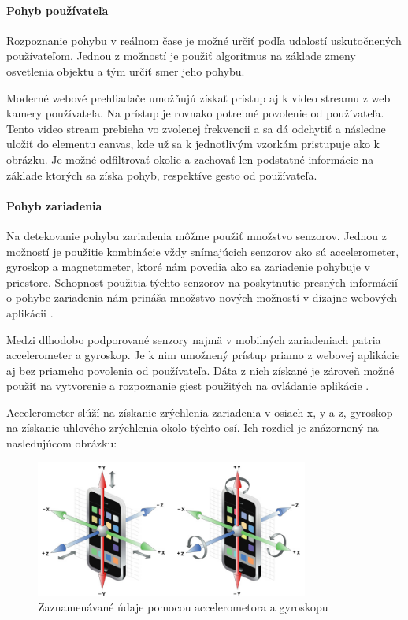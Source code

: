 \newpage
\paragraph{Pohyb používateľa} %

Rozpoznanie pohybu v reálnom čase je možné určiť podľa udalostí uskutočnených používateľom. Jednou z možností je použiť algoritmus na základe zmeny osvetlenia objektu \cite{MotionIllumination} a tým určiť smer jeho pohybu.

Moderné webové prehliadače umožňujú získať prístup aj k video streamu z web kamery používateľa. Na prístup je rovnako potrebné povolenie od používateľa. Tento video stream prebieha vo zvolenej frekvencii a sa dá odchytiť a následne uložiť do elementu canvas, kde už sa k jednotlivým vzorkám pristupuje ako k obrázku. Je možné odfiltrovať okolie a zachovať len podstatné informácie na základe ktorých sa získa pohyb, respektíve gesto od používateľa.


\paragraph{Pohyb zariadenia} %

Na detekovanie pohybu zariadenia môžme použiť množstvo senzorov. Jednou z možností je použitie kombinácie vždy snímajúcich senzorov ako sú accelerometer, gyroskop a magnetometer, ktoré nám povedia ako sa zariadenie pohybuje v priestore. Schopnosť použitia týchto senzorov na poskytnutie presných informácií o pohybe zariadenia nám prináša množstvo nových možností v dizajne webových aplikácii \cite{ultrabooks}.

Medzi dlhodobo podporované senzory najmä v mobilných zariadeniach patria accelerometer a gyroskop. Je k nim umožnený prístup priamo z webovej aplikácie aj bez priameho povolenia od používateľa. Dáta z nich získané je zároveň možné použiť na vytvorenie a rozpoznanie giest použitých na ovládanie aplikácie \cite{AccelerationAndGyroscope}.

Accelerometer slúží na získanie zrýchlenia zariadenia v osiach x, y a z, gyroskop na získanie uhlového zrýchlenia okolo týchto osí. Ich rozdiel je znázornený na nasledujúcom obrázku:

\begin{figure}[H]
  \centering
  \includegraphics[width=0.8\textwidth]{img/accvsgyro.png}
  \caption[Accelerometor a gyroskop]{
    Zaznamenávané údaje pomocou accelerometora a gyroskopu}
  \label{fig: tnavlaptops}
\end{figure}

